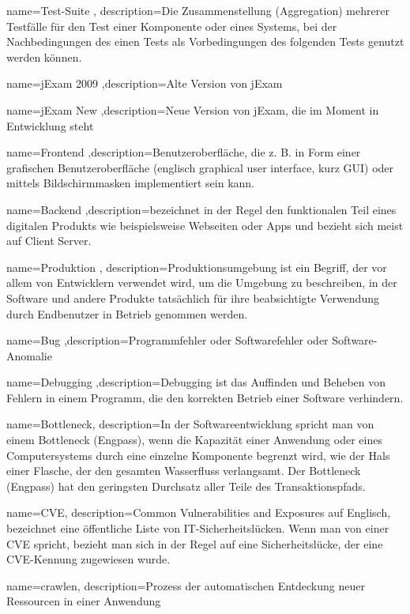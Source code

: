 {name=Test-Suite , description={Die Zusammenstellung (Aggregation) mehrerer Testf\"alle f\"ur den Test einer Komponente oder eines Systems, bei der Nachbedingungen des einen Tests als Vorbedingungen des folgenden Tests genutzt werden k\"onnen.}}

{name=jExam 2009 ,description={Alte Version von jExam}}

{name=jExam New ,description={Neue Version von jExam, die im Moment in Entwicklung steht}}

{name=Frontend ,description={Benutzeroberfl\"ache, die z. B. in Form einer grafischen Benutzeroberfl\"ache (englisch graphical user interface, kurz GUI) oder mittels Bildschirmmasken implementiert sein kann.}}

{name=Backend ,description={bezeichnet in der Regel den funktionalen Teil eines digitalen Produkts wie beispielsweise Webseiten oder Apps und bezieht sich meist auf Client Server.}}

{name=Produktion , description={Produktionsumgebung ist ein Begriff, der vor allem von Entwicklern verwendet wird, um die Umgebung zu beschreiben, in der Software und andere Produkte tats\"achlich f\"ur ihre beabsichtigte Verwendung durch Endbenutzer in Betrieb genommen werden.}}

{name=Bug ,description={Programmfehler oder Softwarefehler oder Software-Anomalie}}

{name=Debugging ,description={Debugging ist das Auffinden und Beheben von Fehlern in einem Programm, die den korrekten Betrieb einer Software verhindern.}}

{name=Bottleneck, description={In der Softwareentwicklung spricht man von einem Bottleneck (Engpass), wenn die Kapazit\"at einer Anwendung oder eines Computersystems durch eine einzelne Komponente begrenzt wird, wie der Hals einer Flasche, der den gesamten Wasserfluss verlangsamt. Der Bottleneck (Engpass) hat den geringsten Durchsatz aller Teile des Transaktionspfads.}}

{name=CVE, description={Common Vulnerabilities and Exposures auf Englisch, bezeichnet eine \"offentliche Liste von IT-Sicherheitsl\"ucken. Wenn man von einer CVE spricht, bezieht man sich in der Regel auf eine Sicherheitsl\"ucke, der eine CVE-Kennung zugewiesen wurde.}}

{name=crawlen, description={Prozess der automatischen Entdeckung neuer Ressourcen in einer Anwendung}}
